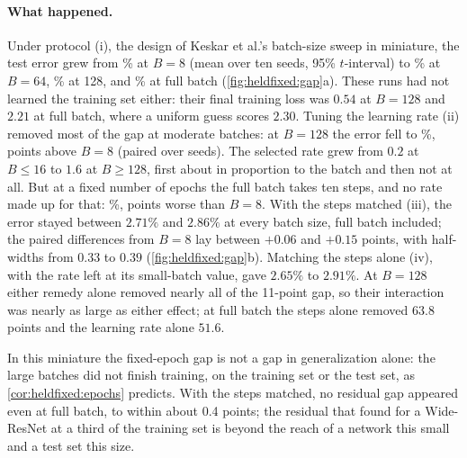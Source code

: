 \begin{refsection}
\paragraph{What happened.} Under protocol (i), the design of Keskar et al.'s batch-size sweep in miniature, the test error grew from \% at $B=8$ (mean over ten seeds, 95\% $t$-interval) to \% at $B=64$, \% at 128, and \% at full batch (\cref{fig:heldfixed:gap}a). These runs had not learned the training set either: their final training loss was $0.54$ at $B=128$ and $2.21$ at full batch, where a uniform guess scores $2.30$. Tuning the learning rate (ii) removed most of the gap at moderate batches: at $B=128$ the error fell to \%,  points above $B=8$ (paired over seeds). The selected rate grew from $0.2$ at $B\le16$ to $1.6$ at $B\ge128$, first about in proportion to the batch and then not at all. But at a fixed number of epochs the full batch takes ten steps, and no rate made up for that: \%,  points worse than $B=8$. With the steps matched (iii), the error stayed between $2.71\%$ and $2.86\%$ at every batch size, full batch included; the paired differences from $B=8$ lay between $+0.06$ and $+0.15$ points, with half-widths from $0.33$ to $0.39$ (\cref{fig:heldfixed:gap}b). Matching the steps alone (iv), with the rate left at its small-batch value, gave $2.65\%$ to $2.91\%$. At $B=128$ either remedy alone removed nearly all of the 11-point gap, so their interaction was nearly as large as either effect; at full batch the steps alone removed $63.8$ points and the learning rate alone $51.6$.

In this miniature the fixed-epoch gap is not a gap in generalization alone: the large batches did not finish training, on the training set or the test set, as \cref{cor:heldfixed:epochs} predicts. With the steps matched, no residual gap appeared even at full batch, to within about 0.4 points; the residual that \textcite{SmithElsenDe2020} found for a Wide-ResNet at a third of the training set is beyond the reach of a network this small and a test set this size.


\end{refsection}
